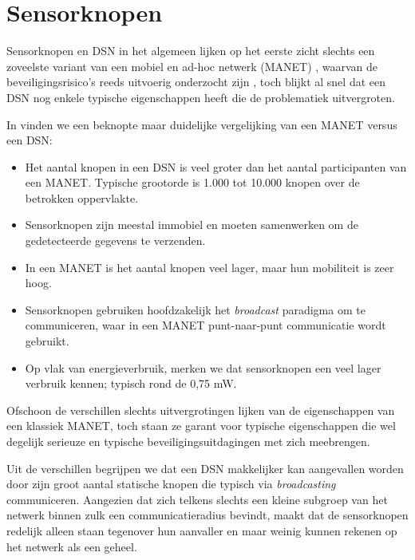 \section{Sensorknopen}
\label{section:problem-hardware}

Sensorknopen en DSN in het algemeen lijken op het eerste zicht slechts een
zoveelste variant van een mobiel en ad-hoc netwerk (MANET)
\citep{garg2010mobile}, waarvan de beveiligingsrisico's reeds uitvoerig
onderzocht zijn \citep{djenouri2005survey, zhang2000intrusion,
kachirski2003effective}, toch blijkt al snel dat een DSN nog enkele typische
eigenschappen heeft die de problematiek uitvergroten.

In \citep{garg2010mobile} vinden we een beknopte maar duidelijke vergelijking
van een MANET versus een DSN:

\begin{itemize}

  \item Het aantal knopen in een DSN is veel groter dan het aantal
  participanten van een MANET. Typische grootorde is 1.000 tot 10.000 knopen
  over de betrokken oppervlakte.

  \item Sensorknopen zijn meestal immobiel en moeten samenwerken om de
  gedetecteerde gegevens te verzenden.

  \item In een MANET is het aantal knopen veel lager, maar hun mobiliteit is
  zeer hoog.

  \item Sensorknopen gebruiken hoofdzakelijk het \emph{broadcast} paradigma om
  te communiceren, waar in een MANET punt-naar-punt communicatie wordt gebruikt.

  \item Op vlak van energieverbruik, merken we dat sensorknopen een veel lager
  verbruik kennen; typisch rond de 0,75 mW.

\end{itemize}

Ofschoon de verschillen slechts uitvergrotingen lijken van de eigenschappen van
een klassiek MANET, toch staan ze garant voor typische eigenschappen die wel
degelijk serieuze en typische beveiligingsuitdagingen met zich meebrengen.

Uit de verschillen begrijpen we dat een DSN makkelijker kan aangevallen worden
door zijn groot aantal statische knopen die typisch via \emph{broadcasting}
communiceren. Aangezien dat zich telkens slechts een kleine subgroep van het
netwerk binnen zulk een communicatieradius bevindt, maakt dat de sensorknopen
redelijk alleen staan tegenover hun aanvaller en maar weinig kunnen rekenen op
het netwerk als een geheel.

